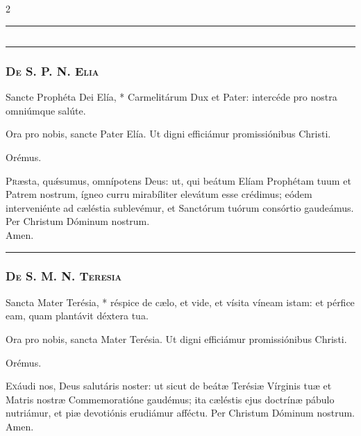 \documentclass[9pt,twoside]{extarticle}
\begin{document}
\begin{multicols}{2}
\begin{center}\textcolor{red}{\rule{\linewidth}{0.5pt}} \end{center}

\subsection*{\center \textsc{}}
\subsubsection*{\center {}}

\begin{center}\textcolor{red}{\rule{\linewidth}{0.5pt}} \end{center}

\subsubsection*{\center \textsc{De S. P. N. Elia}}
\begin{tightlist}{}
\item {} Sancte Prophéta Dei Elía, * Carmelitárum Dux et Pater: intercéde pro nostra omniúmque salúte.
\item {} Ora pro nobis, sancte Pater Elía.  Ut digni efficiámur promissiónibus Christi.
\item Orémus. \hfill {}
\end{tightlist}
\lettrine{P}ræsta, quǽsumus, omnípotens Deus: ut, qui beátum Elíam Prophétam tuum et Patrem nostrum, ígneo curru mirabíliter elevátum esse crédimus; eódem interveniénte ad cæléstia sublevémur, et Sanctórum tuórum consórtio gaudeámus. Per Christum Dóminum nostrum.\\ 
 Amen.

\begin{center}\textcolor{red}{\rule{\linewidth}{0.5pt}} \end{center}

\subsubsection*{\center \textsc{De S. M. N. Teresia}}
\begin{tightlist}{}
\item {} Sancta Mater Terésia, * réspice de cælo, et vide, et vísita víneam istam: et pérfice eam, quam plantávit déxtera tua.
\item {} Ora pro nobis, sancta Mater Terésia.  Ut digni efficiámur promissiónibus Christi.
\item Orémus. \hfill {}
\end{tightlist}
\lettrine{E}xáudi nos, Deus salutáris noster: ut sicut de beátæ Terésiæ Vírginis tuæ et Matris nostræ Commemoratióne gaudémus; ita cæléstis ejus doctrínæ pábulo nutriámur, et piæ devotiónis erudiámur afféctu. Per Christum Dóminum nostrum.  Amen.


\end{multicols}
\end{document}
